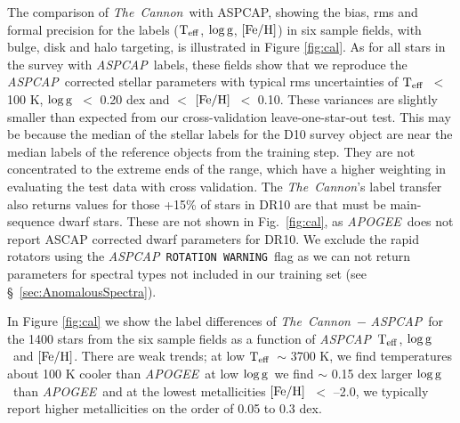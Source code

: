 \documentclass[12pt, preprint]{aastex}
\newcommand{\teff}{\mbox{$\rm T_{eff}$}}
\newcommand{\feh}{\mbox{$\rm [Fe/H]$}}
\newcommand{\logg}{\mbox{$\rm \log g$}}
\newcommand{\tc}{\textsl{The~Cannon}}
\newcommand{\apogee}{\textsl{APOGEE}}
\newcommand{\aspcap}{\textsl{ASPCAP}}
\newcommand{\rotwarn}{\texttt{ROTATION WARNING}}
\begin{document}
The comparison of \tc\ with ASPCAP, showing the bias, rms and formal precision for the labels (\teff , \logg , \feh ) in six sample fields, with bulge, disk and halo targeting, is illustrated in Figure \ref{fig:cal}. As for all stars in the survey with \aspcap\ labels, these fields show that we reproduce the \aspcap\ corrected stellar parameters with typical rms uncertainties of \teff\ $<$ 100 K, \logg\ $<$ 0.20 dex and $<$ \feh\ $<$ 0.10. These variances are slightly smaller than expected from our cross-validation leave-one-star-out test. This may be because the median of the stellar labels for the D10 survey object are near the median labels of the reference objects from the training step. 
They are not concentrated to the extreme ends of the range, which have a higher weighting in evaluating the test data with cross validation. 
The \tc 's label transfer also returns values for those +15\% of stars in DR10 are that must be main-sequence dwarf stars. 
These are not shown in Fig.~\ref{fig:cal}, as \apogee\ does not report ASCAP corrected dwarf parameters for DR10. 
We exclude the rapid rotators using the \aspcap\ \rotwarn\ flag as we can not return parameters for spectral types not included in our training set (see \S~\ref{sec:AnomalousSpectra}). 

In Figure \ref{fig:cal} we show the label differences of \tc\ $-$ \aspcap\ for the 1400 stars from the six sample fields as a function of \aspcap\ \teff, \logg\ and \feh. There are weak trends; at low \teff\ $\sim$ 3700 K, we find temperatures about 100 K cooler than \apogee\, at low \logg\ we find $\sim$ 0.15 dex larger \logg\ than \apogee\ and at the lowest metallicities \feh\ $<$ --2.0, we typically report higher metallicities on the order of 0.05 to 0.3 dex.
\end{document}
